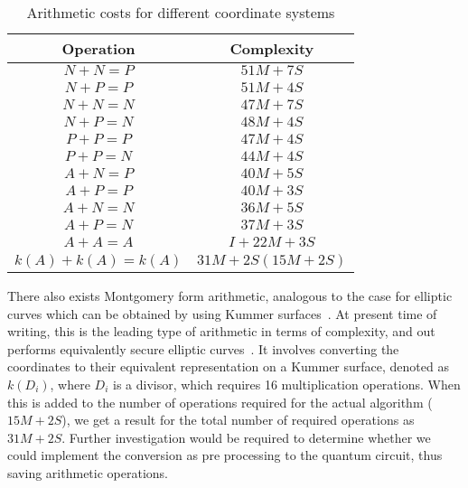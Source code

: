 \begin{table}[!htb]
\centering
\begin{tabular}{|c|c|}
\hline
\multicolumn{1}{|c|}{Operation} & \multicolumn{1}{c|}{Complexity} \\ \hline
$N+N=P$                         & $51M+7S$                        \\
$N+P=P$                         & $51M+4S$                        \\
$N+N=N$                         & $47M+7S$                        \\
$N+P=N$                         & $48M+4S$                        \\
$P+P=P$                         & $47M+4S$                        \\
$P+P=N$                         & $44M+4S$                        \\
$A+N=P$                         & $40M+5S$                        \\
$A+P=P$                         & $40M+3S$                        \\
$A+N=N$                         & $36M+5S$                        \\
$A+P=N$                         & $37M+3S$                        \\
$A+A=A$                         & $I+22M+3S$                     
\\
$k(A)+k(A)=k(A)$				& $31M+2S (15M+2S)$
\\ \hline
\end{tabular}
\caption{Arithmetic costs for different coordinate  systems}
\label{table:arithmeticCosts}
\end{table}
There also exists Montgomery form arithmetic, analogous to the case for elliptic curves which can be obtained by using Kummer surfaces~\cite{duquesne2004montgomery}. At present time of writing, this is the leading type of arithmetic in terms of complexity, and out performs equivalently secure elliptic curves~\cite{cryptoeprint:2012:670}. It involves converting the coordinates to their equivalent representation on a Kummer surface, denoted as $k(D_i)$, where $D_i$ is a divisor, which requires 16 multiplication operations. When this is added to the number of operations required for the actual algorithm ($15M+2S$), we get a result for the total number of required operations as $31M+2S$. Further investigation would be required to determine whether we could implement the conversion as pre processing to the quantum circuit, thus saving arithmetic operations.



